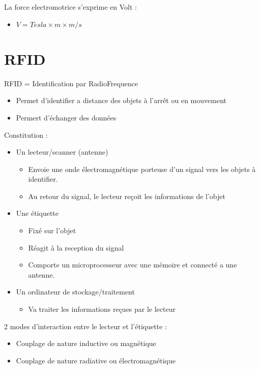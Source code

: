 \documentclass[a4paper]{article}
\begin{document}
\vspace{0.5cm}
La force electromotrice s'exprime en Volt :
\begin{itemize}
    \item $V = Tesla \times m \times m/s$
\end{itemize}

\section{RFID}
RFID = Identification par RadioFrequence
\begin{itemize}
    \item Permet d'identifier a distance des objets à l'arrêt ou en mouvement
    \item Permert d'échanger des données 
\end{itemize}
\vspace{0.5cm}
Constitution :
\begin{itemize}
    \item Un lecteur/scanner (antenne)
    \begin{itemize}
        \item Envoie une onde électromagnétique porteuse d'un signal vers les objets à identifier.
        \item Au retour du signal, le lecteur reçoit les informations de l'objet
    \end{itemize}
    \item Une étiquette
    \begin{itemize}
        \item Fixé sur l'objet
        \item Réagit à la reception du signal
        \item Comporte un microprocesseur avec une mémoire et connecté a une antenne.
    \end{itemize}
    \item Un ordinateur de stockage/traitement
    \begin{itemize}
        \item Va traiter les informations reçues par le lecteur
    \end{itemize}
\end{itemize}
\vspace{0.5cm}

2 modes d'interaction entre le lecteur et l'étiquette :
\begin{itemize}
    \item Couplage de nature inductive ou magnétique
    \item Couplage de nature radiative ou électromagnétique
\end{itemize}
\end{document}
